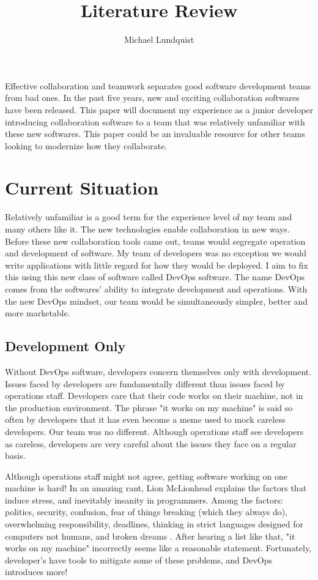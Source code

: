 \documentclass[titlepage]{article}
\author{Michael Lundquist}
\title{Literature Review}
\begin{document}
\maketitle

Effective collaboration and teamwork separates good software development teams from bad ones. In the past five years, new and exciting collaboration softwares have been released. This paper will document my experience as a junior developer introducing collaboration software to a team that was relatively unfamiliar with these new softwares. This paper could be an invaluable resource for other teams looking to modernize how they collaborate.


\section{Current Situation}

Relatively unfamiliar is a good term for the experience level of my team and many others like it. The new technologies enable collaboration in new ways. Before these new collaboration tools came out, teams would segregate operation and development of software. My team of developers was no exception we would write applications with little regard for how they would be deployed. I aim to fix this using this new class of software called DevOps software. The name DevOps comes from the softwares' ability to integrate development and operations. With the new DevOps mindset, our team would be simultaneously simpler, better and more marketable.

\subsection{Development Only}

Without DevOps software, developers concern themselves only with development. Issues faced by developers are fundamentally different than issues faced by operations staff. Developers care that their code works on their machine, not in the production environment. The phrase "it works on my machine" is said so often by developers that it has even become a meme used to mock careless developers. Our team was no different. Although operations staff see developers as careless, developers are very careful about the issues they face on a regular basis. 

Although operations staff might not agree, getting software working on one machine is hard! In an amazing rant, Lion McLionhead explains the factors that induce stress, and inevitably insanity in programmers. Among the factors: politics, security, confusion, fear of things breaking (which they always do), overwhelming responsibility, deadlines, thinking in strict languages designed for computers not humans, and broken dreams \cite{Lion.2014}. After hearing a list like that, "it works on my machine" incorrectly seems like a reasonable statement. Fortunately, developer's have tools to mitigate some of these problems, and DevOps introduces more! 
\end{document}
